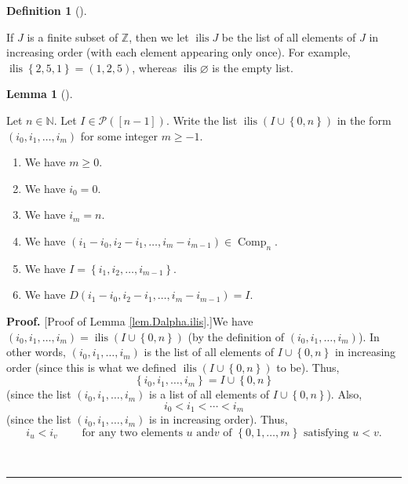 \documentclass[numbers=enddot,12pt,final,onecolumn,notitlepage,abstracton]{scrartcl}
\theoremstyle{definition}
\newtheorem{lem}[theo]{Lemma}
\newenvironment{lemma}[1][]
{\begin{lem}[#1]\begin{leftbar}}
{\end{leftbar}\end{lem}}
\newtheorem{defi}[theo]{Definition}
\newenvironment{definition}[1][]
{\begin{defi}[#1]\begin{leftbar}}
{\end{leftbar}\end{defi}}
\newenvironment{proof}[1][Proof]{\noindent\textbf{#1.} }{\ \rule{0.5em}{0.5em}}
\newenvironment{verlong}{}{}
\begin{document}
\begin{verlong}
\begin{footnotesize}
\begin{definition}
If $J$ is a finite subset of $\mathbb{Z}$, then we let $\operatorname*{ilis}J$
be the list of all elements of $J$ in increasing order (with each element
appearing only once). For example, $\operatorname*{ilis}\left\{
2,5,1\right\}  =\left(  1,2,5\right)  $, whereas $\operatorname*{ilis}%
\varnothing$ is the empty list.
\end{definition}

\begin{lemma}
\label{lem.Dalpha.ilis}Let $n\in\mathbb{N}$. Let $I\in\mathcal{P}\left(
\left[  n-1\right]  \right)  $. Write the list $\operatorname*{ilis}\left(
I\cup\left\{  0,n\right\}  \right)  $ in the form $\left(  i_{0},i_{1}%
,\ldots,i_{m}\right)  $ for some integer $m\geq-1$.

\begin{enumerate}
\item[(a)] We have $m\geq0$.

\item[(b)] We have $i_{0}=0$.

\item[(c)] We have $i_{m}=n$.

\item[(d)] We have $\left(  i_{1}-i_{0},i_{2}-i_{1},\ldots,i_{m}%
-i_{m-1}\right)  \in\operatorname*{Comp}\nolimits_{n}$.

\item[(e)] We have $I=\left\{  i_{1},i_{2},\ldots,i_{m-1}\right\}  $.

\item[(f)] We have $D\left(  i_{1}-i_{0},i_{2}-i_{1},\ldots,i_{m}%
-i_{m-1}\right)  =I$.
\end{enumerate}
\end{lemma}

\begin{proof}
[Proof of Lemma \ref{lem.Dalpha.ilis}.]We have $\left(  i_{0},i_{1}%
,\ldots,i_{m}\right)  =\operatorname*{ilis}\left(  I\cup\left\{  0,n\right\}
\right)  $ (by the definition of $\left(  i_{0},i_{1},\ldots,i_{m}\right)  $).
In other words, $\left(  i_{0},i_{1},\ldots,i_{m}\right)  $ is the list of all
elements of $I\cup\left\{  0,n\right\}  $ in increasing order (since this is
what we defined $\operatorname*{ilis}\left(  I\cup\left\{  0,n\right\}
\right)  $ to be). Thus,
\[
\left\{  i_{0},i_{1},\ldots,i_{m}\right\}  =I\cup\left\{  0,n\right\}
\]
(since the list $\left(  i_{0},i_{1},\ldots,i_{m}\right)  $ is a list of all
elements of $I\cup\left\{  0,n\right\}  $). Also,
\[
i_{0}<i_{1}<\cdots<i_{m}%
\]
(since the list $\left(  i_{0},i_{1},\ldots,i_{m}\right)  $ is in increasing
order). Thus,%
\begin{equation}
i_{u}<i_{v}\ \ \ \ \ \ \ \ \ \ \text{for any two elements }u\text{ and
}v\text{ of }\left\{  0,1,\ldots,m\right\}  \text{ satisfying }u<v.
\label{pf.lem.Dalpha.ilis.1}%
\end{equation}



\end{proof}
\end{footnotesize}
\end{verlong}
\end{document}
